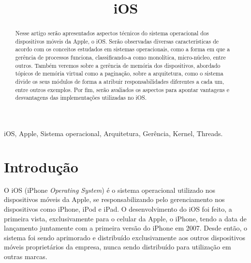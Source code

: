 \documentclass[conference]{IEEEtran}
\begin{document}
\title{iOS}

\author{
}

\maketitle


\begin{abstract}
Nesse artigo serão apresentados aspectos técnicos do sistema operacional dos dispositivos móveis da Apple, o iOS. Serão observadas diversas características de acordo com os conceitos estudados em sistemas operacionais, como a forma em que a gerência de processos funciona, classificando-a como monolítica, micro-núcleo, entre outros. Também veremos sobre a gerência de memória dos dispositivos, abordado tópicos de memória virtual como a paginação, sobre a arquitetura, como o sistema divide os seus módulos de forma a atribuir responsabilidades diferentes a cada um, entre outros exemplos. Por fim, serão avaliados os aspectos para apontar vantagens e desvantagens das implementações utilizadas no iOS.
\end{abstract}

\begin{IEEEkeywords}
iOS, Apple, Sistema operacional, Arquitetura, Gerência, Kernel, Threads.
\end{IEEEkeywords}

\section{Introdução}
O iOS (iPhone \textit{Operating System}) é o sistema operacional utilizado nos dispositivos móveis da Apple, se responsabilizando pelo gerenciamento nos dispositivos como iPhone, iPod e iPad. O desenvolvimento do iOS foi feito, a primeira vista, exclusivamente para o celular da Apple, o iPhone, tendo a data de lançamento juntamente com a primeira versão do iPhone em 2007. Desde então, o sistema foi sendo aprimorado e distribuído exclusivamente aos outros dispositivos móveis proprietários da empresa, nunca sendo distribuído para utilização em outras marcas.
\end{document}
